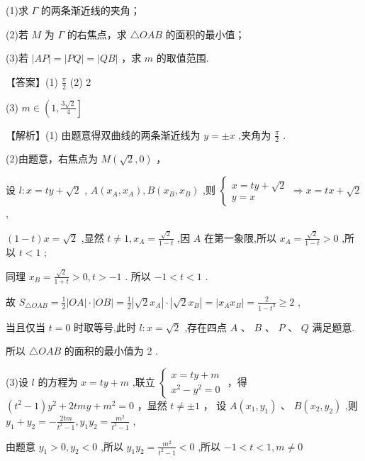 \documentclass[10pt]{article}
\begin{document}
(1)求 \(\Gamma\) 的两条渐近线的夹角；

(2)若 \(M\) 为 \(\Gamma\) 的右焦点，求 \(\bigtriangleup  {OAB}\) 的面积的最小值；

(3)若 \(\left| {AP}\right|  = \left| {PQ}\right|  = \left| {QB}\right|\) ，求 \(m\) 的取值范围.

【答案】(1) \(\frac{\pi }{2}\) (2) 2

(3) \(m \in  \left( {1,\frac{3\sqrt{2}}{4}}\right\rbrack\)

【解析】(1) 由题意得双曲线的两条渐近线为 \(y =  \pm  x\) ,夹角为 \(\frac{\pi }{2}\) .

(2)由题意，右焦点为 \(M\left( {\sqrt{2},0}\right)\) ，

设 \(l : x = {ty} + \sqrt{2}\) , \(A\left( {{x}_{A},{x}_{A}}\right) ,B\left( {{x}_{B},{x}_{B}}\right)\) ,则 \(\left\{  {\begin{array}{l} x = {ty} + \sqrt{2} \\  y = x \end{array} \Rightarrow  x = {tx} + \sqrt{2}}\right.\) ,

\(\left( {1 - t}\right) x = \sqrt{2}\) ,显然 \(t \neq  1,{x}_{A} = \frac{\sqrt{2}}{1 - t}\) ,因 \(A\) 在第一象限,所以 \({x}_{A} = \frac{\sqrt{2}}{1 - t} > 0\) ,所以 \(t < 1\) ;

同理 \({x}_{B} = \frac{\sqrt{2}}{1 + t} > 0,t >  - 1\) . 所以 \(- 1 < t < 1\) .

故 \({S}_{\bigtriangleup {OAB}} = \frac{1}{2}\left| {OA}\right|  \cdot  \left| {OB}\right|  = \frac{1}{2}\left| {\sqrt{2}{x}_{A}}\right|  \cdot  \left| {\sqrt{2}{x}_{B}}\right|  = \left| {{x}_{A}{x}_{B}}\right|  = \frac{2}{1 - {t}^{2}} \geq  2\) ,

当且仅当 \(t = 0\) 时取等号,此时 \(l : x = \sqrt{2}\) ,存在四点 \(A\text{ 、 }B\text{ 、 }P\text{ 、 }Q\) 满足题意.

所以 \(\bigtriangleup {OAB}\) 的面积的最小值为 2 .

(3)设 \(l\) 的方程为 \(x = {ty} + m\) ,联立 \(\left\{  \begin{array}{l} x = {ty} + m \\  {x}^{2} - {y}^{2} = 0 \end{array}\right.\) ，得 \(\left( {{t}^{2} - 1}\right) {y}^{2} + {2tm}y + {m}^{2} = 0\) ，显然 \(t \neq   \pm  1\) ， 设 \(A\left( {{x}_{1},{y}_{1}}\right) \text{ 、 }B\left( {{x}_{2},{y}_{2}}\right)\) ,则 \({y}_{1} + {y}_{2} =  - \frac{2tm}{{t}^{2} - 1},{y}_{1}{y}_{2} = \frac{{m}^{2}}{{t}^{2} - 1}\) ,

由题意 \({y}_{1} > 0,{y}_{2} < 0\) ,所以 \({y}_{1}{y}_{2} = \frac{{m}^{2}}{{t}^{2} - 1} < 0\) ,所以 \(- 1 < t < 1,m \neq  0\)
\end{document}
